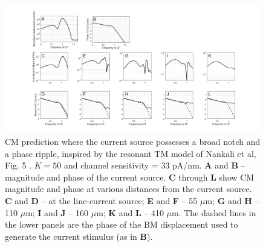 \documentclass{article}
\begin{document}
\begin{figure}[h]
\centering
\includegraphics[width = \textwidth]{final_figures/compbroadnotch.png}
\caption{CM prediction where the current source possesses a broad notch and a phase ripple,  inspired by the resonant TM model of Nankali et al, Fig. 5 \cite{nankaliwang}. $K=50$ and channel sensitivity = 33 pA/nm.  \textbf{A} and \textbf{B} -- magnitude and phase of the current source. \textbf{C} through \textbf{L} show CM magnitude and phase at various distances from the current source.  \textbf{C} and \textbf{D} -- at the line-current source; \textbf{E} and \textbf{F} -- 55 $\mu$m; \textbf{G} and \textbf{H} -- 110 $\mu$m; \textbf{I} and \textbf{J} -- 160 $\mu$m; \textbf{K} and \textbf{L} -- 410 $\mu$m. The dashed lines in the lower panels are the phase of the BM displacement used to generate the current stimulus (as in \textbf{B}).}
\label{notchbroad}
\end{figure}


\clearpage

\printbibliography
\end{document}
